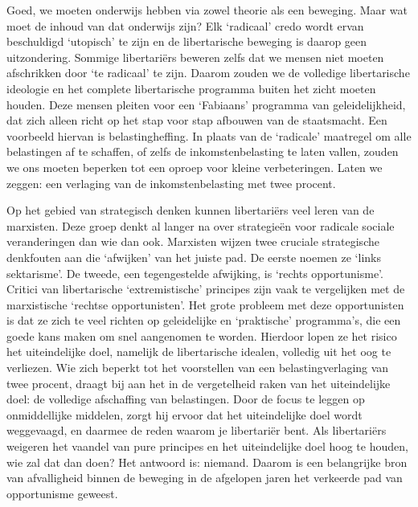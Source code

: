 \documentclass[
  a5paper,
  smalldemyvopaper,10pt,twoside,onecolumn,openright,extrafontsizes,hidelinks]{memoir}
\begin{document}
Goed, we moeten onderwijs hebben via zowel theorie als een beweging.
Maar wat moet de inhoud van dat onderwijs zijn? Elk `radicaal' credo
wordt ervan beschuldigd `utopisch' te zijn en de libertarische beweging
is daarop geen uitzondering. Sommige libertariërs beweren zelfs dat we
mensen niet moeten afschrikken door `te radicaal' te zijn. Daarom zouden
we de volledige libertarische ideologie en het complete libertarische
programma buiten het zicht moeten houden. Deze mensen pleiten voor een
`Fabiaans' programma van geleidelijkheid, dat zich alleen richt op het
stap voor stap afbouwen van de staatsmacht. Een voorbeeld hiervan is
belastingheffing. In plaats van de `radicale' maatregel om alle
belastingen af te schaffen, of zelfs de inkomstenbelasting te laten
vallen, zouden we ons moeten beperken tot een oproep voor kleine
verbeteringen. Laten we zeggen: een verlaging van de inkomstenbelasting
met twee procent.

Op het gebied van strategisch denken kunnen libertariërs veel leren van
de marxisten. Deze groep denkt al langer na over strategieën voor
radicale sociale veranderingen dan wie dan ook. Marxisten wijzen twee
cruciale strategische denkfouten aan die `afwijken' van het juiste pad.
De eerste noemen ze `links sektarisme'. De tweede, een tegengestelde
afwijking, is `rechts opportunisme'. Critici van libertarische
`extremistische' principes zijn vaak te vergelijken met de marxistische
`rechtse opportunisten'. Het grote probleem met deze opportunisten is
dat ze zich te veel richten op geleidelijke en `praktische' programma's,
die een goede kans maken om snel aangenomen te worden. Hierdoor lopen ze
het risico het uiteindelijke doel, namelijk de libertarische idealen,
volledig uit het oog te verliezen. Wie zich beperkt tot het voorstellen
van een belastingverlaging van twee procent, draagt bij aan het in de
vergetelheid raken van het uiteindelijke doel: de volledige afschaffing
van belastingen. Door de focus te leggen op onmiddellijke middelen,
zorgt hij ervoor dat het uiteindelijke doel wordt weggevaagd, en daarmee
de reden waarom je libertariër bent. Als libertariërs weigeren het
vaandel van pure principes en het uiteindelijke doel hoog te houden, wie
zal dat dan doen? Het antwoord is: niemand. Daarom is een belangrijke
bron van afvalligheid binnen de beweging in de afgelopen jaren het
verkeerde pad van opportunisme geweest.
\end{document}
